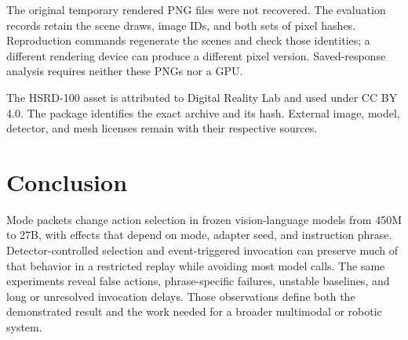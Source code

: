 \documentclass[10pt]{article}
\begin{document}
The original temporary rendered PNG files were not recovered.
The evaluation records retain the scene draws, image IDs, and
both sets of pixel hashes. Reproduction commands regenerate
the scenes and check those identities; a different rendering
device can produce a different pixel version. Saved-response
analysis requires neither these PNGs nor a GPU.

The HSRD-100 asset is attributed to Digital Reality Lab and
used under CC BY 4.0. The package identifies the exact archive
and its hash. External image, model, detector, and mesh
licenses remain with their respective sources.

\section{Conclusion}
Mode packets change action selection in frozen vision-language
models from 450M to 27B, with effects that depend on mode,
adapter seed, and instruction phrase. Detector-controlled
selection and event-triggered invocation can preserve much
of that behavior in a restricted replay while avoiding most
model calls. The same experiments reveal false actions,
phrase-specific failures, unstable baselines, and long or
unresolved invocation delays. Those observations define both
the demonstrated result and the work needed for a broader
multimodal or robotic system.

\FloatBarrier


\clearpage
\appendix
\end{document}

